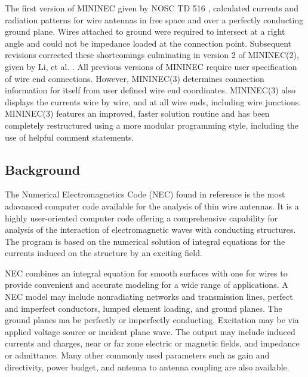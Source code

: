 \documentclass[12pt]{article}
\begin{document}
The first version of MININEC given by NOSC TD 516 \cite{r1}, calculated
currents and radiation patterns for wire antennas in free space and over
a perfectly conducting ground plane. Wires attached to ground were
required to intersect at a right angle and could not be impedance loaded
at the connection point. Subsequent revisions corrected these
shortcomings culminating in version 2 of MININEC(2), given by Li, et al.
\cite{r3}. All previous versions of MININEC require user specification
of wire end connections. However, MININEC(3) determines connection
information for itself from user defined wire end coordinates.
MININEC(3) also displays the currents wire by wire, and at all wire
ends, including wire junctions. MININEC(3) features an improved, faster
solution routine and has been completely restructured using a more
modular programming style, including the use of helpful comment
statements.

\subsection{Background}
The Numerical Electromagnetics Code (NEC) found in reference \cite{r4}
is the most adavanced computer code available for the analysis of thin
wire antennas. It is a highly user-oriented computer code offering a
comprehensive capability for analysis of the interaction of
electromagnetic waves with conducting structures. The program is based
on the numerical solution of integral equations for the currents induced
on the structure by an exciting field.

NEC combines an integral equation for smooth surfaces with one for wires
to provide convenient and accurate modeling for a wide range of
applications. A NEC model may include nonradiating networks and
transmission lines, perfect and imperfect conductors, lumped element
loading, and ground planes. The ground planes ma be perfectly or
imperfectly conducting. Excitation may be via applied voltage source or
incident plane wave. The output may include induced currents and
charges, near or far zone electric or magnetic fields, and impedance or
admittance. Many other commonly used parameters such as gain and
directivity, power budget, and antenna to antenna coupling are also
available.
\end{document}
